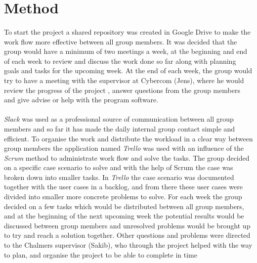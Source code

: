 
\section{Method}


\paragraph{}
To start the project a shared repository was created in Google Drive to make the work flow more effective between all group members. It was decided that the group would have a minimum of two meetings a week, at the beginning and end of each week to review and discuss the work done so far along with planning goals and tasks for the upcoming week. At the end of each week, the group would try to have a meeting with the supervisor at Cybercom (Jens), where he would review the  progress of the project , answer questions from the group members and give advise or help with the program software. 

\paragraph{}
\textit{Slack} was used as a professional source of communication between all group members and so far it has made the daily internal  group contact simple and efficient. To organise the work and distribute the workload in a clear way between group members the application named \textit{Trello}  was used with an influence of the \textit{Scrum} method to administrate work flow and  solve the tasks. 
The group decided on  a specific case scenario to solve and with the help of Scrum the case was broken down into smaller tasks. In \textit{Trello} the case scenario was documented together with the user cases in a backlog, and from there these user cases were divided into smaller more concrete problems to solve. For each week the group decided on a few tasks which would be distributed between all group members, and at the beginning of the next upcoming week the potential results would be discussed between group members and unresolved problems would be brought up to try and reach a solution together.  Other questions and problems were directed to the Chalmers supervisor (Sakib), who through the project  helped with the way to plan, and organise the project to be able to complete in time 
